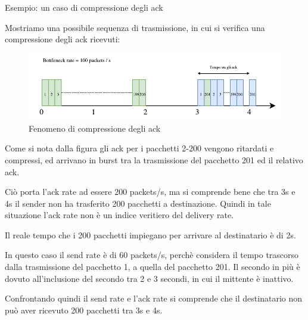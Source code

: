 \begin{esempio}{Esempio: un caso di compressione degli ack}

Mostriamo una possibile sequenza di trasmissione, in cui si verifica una compressione degli ack ricevuti:

\begin{figure}[H]

\center
\caption{Fenomeno di compressione degli ack}
\includegraphics[scale=0.9]{chapters/bbr/img/ack_rate_overstimate.pdf}

\end{figure}

Come si nota dalla figura gli ack per i pacchetti 2-200 vengono ritardati e compressi, ed arrivano in burst tra la trasmissione del pacchetto 201 ed il relativo ack. \bigskip

Ciò porta l'ack rate ad essere 200 packets/s, ma si comprende bene che tra 3s e 4s il sender non ha trasferito 200 pacchetti a destinazione. Quindi in tale situazione l'ack rate non è un indice veritiero del delivery rate. \bigskip

Il reale tempo che i 200 pacchetti impiegano per arrivare al destinatario è di 2s. \bigskip

In questo caso il send rate è di 60 packets/s, perchè considera il tempo trascorso dalla trasmissione del pacchetto 1, a quella del pacchetto 201. Il secondo in più è dovuto all'inclusione del secondo tra 2 e 3 secondi, in cui il mittente è inattivo. \bigskip

Confrontando quindi il send rate e l'ack rate si comprende che il destinatario non può aver ricevuto 200 pacchetti tra 3s e 4s.

\end{esempio}

